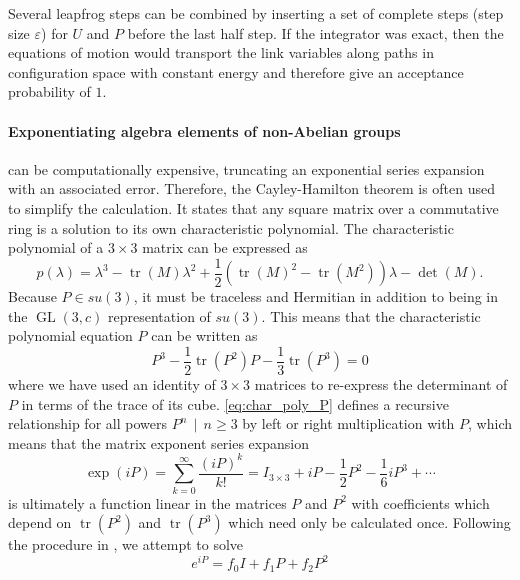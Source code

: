 \documentclass[a4paper,10pt]{book}
\begin{document}
Several leapfrog steps can be combined by inserting a set of complete steps (step size $\varepsilon$) for $U$ and $P$ before the last half step. If the integrator was exact, then the equations of motion would transport the link variables along paths in configuration space with constant energy and therefore give an acceptance probability of $1$. \paragraph{Exponentiating algebra elements of non-Abelian groups} can be computationally expensive, truncating an exponential series expansion with an associated error. Therefore, the Cayley-Hamilton theorem is often used to simplify the calculation. It states that any square matrix over a commutative ring is a solution to its own characteristic polynomial. The characteristic polynomial of a $3\times3$ matrix can be expressed as
\begin{equation}
p(\lambda)=\lambda^{3}-\operatorname{tr}(M) \lambda^{2}+\frac{1}{2}\left(\operatorname{tr}(M)^{2}-\operatorname{tr}\left(M^{2}\right)\right) \lambda-\operatorname{det}(M).
\end{equation}
Because $P \in su(3)$, it must be traceless and Hermitian in addition to being in the $ \operatorname{GL}(3,c)$ representation of $su(3)$. This means that the characteristic polynomial equation $P$ can be written as
\begin{equation}\label{eq:char_poly_P}
P^{3}-\frac{1}{2}\operatorname{tr}\left(P^{2}\right)P-\frac{1}{3}\operatorname{tr}(P^3) = 0
\end{equation}
where we have used an identity of $3\times3$ matrices to re-express the determinant of $P$ in terms of the trace of its cube. \eqref{eq:char_poly_P} defines a recursive relationship for all powers $P^n\,\mid\,n\geq3$ by left or right multiplication with $P$, which means that the matrix exponent series expansion 
\begin{equation}
\exp (iP)=\sum_{k=0}^{\infty} \frac{(iP)^{k}}{k !}=I_{3\times3}+iP-\frac{1}{2} P^{2}-\frac{1}{6}i P^{3}+\cdots
\end{equation}
is ultimately a function linear in the matrices $P$ and $P^2$ with coefficients which depend on $\operatorname{tr}(P^2)$ and $\operatorname{tr}(P^3)$ which need only be calculated once. Following the procedure in \cite{morningstar2004analytic}, we attempt to solve 
\begin{equation}\label{eq:Cay_ham_eq}
e^{i P}=f_{0} I+f_{1} P+f_{2} P^{2} 
\end{equation}
\end{document}
